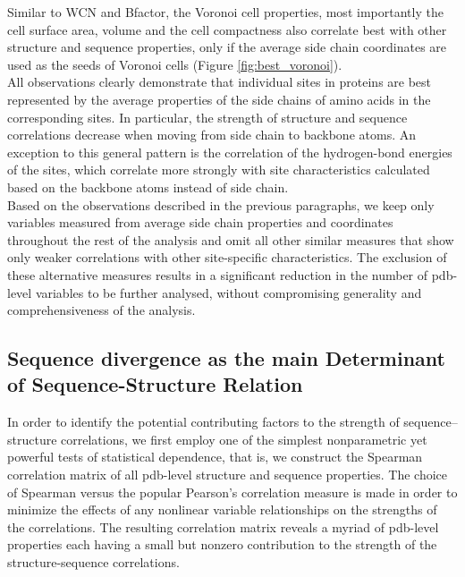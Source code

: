\documentclass[12pt]{article}
\begin{document}
        Similar to WCN and Bfactor, the Voronoi cell properties, most importantly the cell surface area, volume and the cell compactness also correlate best with other structure and sequence properties, only if the average side chain coordinates are used as the seeds of Voronoi cells (Figure \ref{fig:best_voronoi}).
        \\

        All observations clearly demonstrate that individual sites in proteins are best represented by the average properties of the side chains of amino acids in the corresponding sites. In particular, the strength of structure and sequence correlations decrease when moving from side chain to backbone atoms. An exception to this general pattern is the correlation of the hydrogen-bond energies of the sites, which correlate more strongly with site characteristics calculated based on the backbone atoms instead of side chain.
        \\

        Based on the observations described in the previous paragraphs, we keep only variables measured from average side chain properties and coordinates throughout the rest of the analysis and omit all other similar measures that show only weaker correlations with other site-specific characteristics. The exclusion of these alternative measures results in a significant reduction in the number of pdb-level variables to be further analysed, without compromising generality and comprehensiveness of the analysis.
        \\


    \subsection*{Sequence divergence as the main Determinant of Sequence-Structure Relation}

        In order to identify the potential contributing factors to the strength of sequence--structure correlations, we first employ one of the simplest nonparametric yet powerful tests of statistical dependence, that is, we construct the Spearman correlation matrix of all pdb-level structure and sequence properties. The choice of Spearman versus the popular Pearson's correlation measure is made in order to minimize the effects of any nonlinear variable relationships on the strengths of the correlations.  The resulting correlation matrix reveals a myriad of pdb-level properties each having a small but nonzero contribution to the strength of the structure-sequence correlations.
        \\
\end{document}

